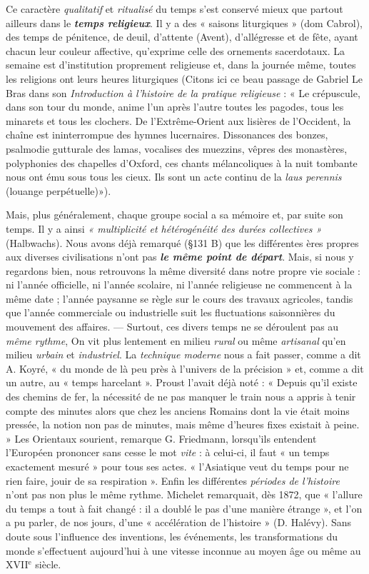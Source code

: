 {Ce caractère {\it qualitatif} et {\it ritualisé} du temps s’est conservé mieux que
partout ailleurs dans le \textbf{\textit {temps religieux}}. Il y a des « saisons liturgiques »
(dom Cabrol), des temps de pénitence, de deuil, d'attente (Avent), d’allégresse
et de fête, ayant chacun leur couleur affective, qu’exprime celle des
ornements sacerdotaux. La semaine est d'institution proprement religieuse
et, dans la journée même, toutes les religions ont leurs heures liturgiques
{\scriptsize (Citons ici ce beau passage de Gabriel Le Bras dans son {\it Introduction à l'histoire
de la pratique religieuse} : « Le crépuscule, dans son tour du monde, anime l'un après
l’autre toutes les pagodes, tous les minarets et tous les clochers. De l’Extrême-Orient
aux lisières de l'Occident, la chaîne est ininterrompue des hymnes lucernaires. Dissonances
des bonzes, psalmodie gutturale des lamas, vocalises des muezzins, vêpres des
monastères, polyphonies des chapelles d'Oxford, ces chants mélancoliques à la nuit
tombante nous ont ému sous tous les cieux. Ils sont un acte continu de la {\it laus perennis}
{\scriptsize (louange perpétuelle)}»)}.

Mais, plus généralement, chaque groupe social a sa mémoire et, par suite
son temps. Il y a ainsi \textsf{\textit {« multiplicité et hétérogénéité des durées collectives »}}
(Halbwachs). Nous avons déjà remarqué (\S 131 B) que les différentes ères
propres aux diverses civilisations n’ont pas \textbf{\textit {le même point de départ}}. Mais, si
nous y regardons bien, nous retrouvons la même diversité dans notre propre
vie sociale : ni l’année officielle, ni l’année scolaire, ni l’année religieuse ne
commencent à la même date ; l’année paysanne se règle sur le cours des
travaux agricoles, tandis que l’année commerciale ou industrielle suit les
fluctuations saisonnières du mouvement des affaires. — Surtout, ces divers
temps ne se déroulent pas au \textsf{\textit {même rythme}}, On vit plus lentement en milieu
{\it rural} ou même {\it artisanal} qu’en milieu {\it urbain} et {\it industriel}. La {\it technique
moderne} nous a fait passer, comme a dit A. Koyré, « du monde de là peu
près à l’univers de la précision » et, comme a dit un autre, au « temps harcelant ».
Proust l'avait déjà noté : « Depuis qu’il existe des chemins de fer,
la nécessité de ne pas manquer le train nous a appris à tenir compte des
minutes alors que chez les anciens Romains dont la vie était moins pressée,
la notion non pas de minutes, mais même d'heures fixes existait à peine. »
Les Orientaux sourient, remarque G. Friedmann, lorsqu'ils entendent
l’Européen prononcer sans cesse le mot {\it vite} : à celui-ci, il faut « un temps
exactement mesuré » pour tous ses actes. « l’Asiatique veut du temps pour
ne rien faire, jouir de sa respiration ». Enfin les différentes {\it périodes de
l'histoire} n’ont pas non plus le même rythme. Michelet remarquait, dès
1872, que « l'allure du temps a tout à fait changé : il a doublé le pas d’une
manière étrange », et l’on a pu parler, de nos jours, d’une « accélération de
l'histoire » (D. Halévy). Sans doute sous l'influence des inventions, les
événements, les transformations du monde s'effectuent aujourd’hui à une
vitesse inconnue au moyen âge ou même au {\footnotesize XVII}$^\text{e}$ siècle.

}
